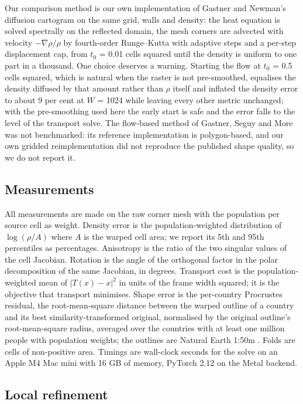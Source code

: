 Our comparison method is our own implementation of Gastner and Newman's
diffusion cartogram \citep{gastner2004} on the same grid, walls and density:
the heat equation is solved spectrally on the reflected domain, the mesh
corners are advected with velocity \(-\nabla\rho/\rho\) by fourth-order
Runge--Kutta with adaptive steps and a per-step displacement cap, from
\(t_0\) = 0.01 cells squared until the density is uniform to one part in
a thousand. One choice deserves a warning. Starting the flow at \(t_0\)
= 0.5 cells squared, which is natural when the raster is not
pre-smoothed, equalises the density diffused by that amount rather than
\(\rho\) itself and inflated the density error to about 9 per cent at
\(W\) = 1024 while leaving every other metric unchanged; with the
pre-smoothing used here the early start is safe and the error falls to
the level of the transport solve. The flow-based method of Gastner,
Seguy and More \citep{gastner2018} was not benchmarked: its reference
implementation is polygon-based, and our own gridded reimplementation
did not reproduce the published shape quality, so we do not report it.

\subsection{Measurements}\label{measurements}

All measurements are made on the raw corner mesh with the population per
source cell as weight. Density error is the population-weighted
distribution of \(\log(\rho/A)\) where \(A\) is the warped cell area; we
report its 5th and 95th percentiles as percentages. Anisotropy is the
ratio of the two singular values of the cell Jacobian. Rotation is the
angle of the orthogonal factor in the polar decomposition of the same
Jacobian, in degrees. Transport cost is the population-weighted mean of
\(|T(x)-x|^2\) in units of the frame width squared; it is the objective
that transport minimises. Shape error is the per-country Procrustes
residual, the root-mean-square distance between the warped outline of a
country and its best similarity-transformed original, normalised by the
original outline's root-mean-square radius, averaged over the countries
with at least one million people with population weights; the outlines
are Natural Earth 1:50m \citep{naturalearth}. Folds are cells of non-positive
area. Timings are wall-clock seconds for the solve on an Apple M4 Mac
mini with 16 GB of memory, PyTorch 2.12 on the Metal backend.

\subsection{Local refinement}\label{local-refinement}

